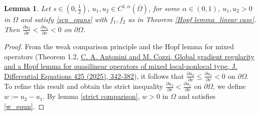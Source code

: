 \documentclass[10pt,a4paper]{amsart}
\newtheorem{lemma}[theorem]{Lemma}
\newcommand{\Om}{\Omega}
\newcommand{\pa}{\partial}
\begin{document}
\begin{lemma}\label{hopf_first}
    Let $s \in \left(0, \frac{1}{2}\right)$, $u_1, u_2 \in C^{1,\alpha}(\overline{\Om})$, for some $\alpha\in(0,1)$, $u_1, u_2 > 0$ in $\Om$ and satisfy \eqref{scp_equns} with $f_1, f_2$ as in Theorem \ref{Hopf lemma_linear case}. Then $\frac{\pa u_2}{\pa\nu} < \frac{\pa u_1}{\pa\nu} < 0$ on $\pa\Om$.
\end{lemma}

\begin{proof}
    From the weak comparison principle and the Hopf lemma for mixed operators (Theorem 1.2, \href{https://doi.org/10.1016/j.jde.2025.01.030}{C. A. Antonini and M. Cozzi, Global gradient regularity and a Hopf lemma for quasilinear operators of mixed local-nonlocal type, J. Differential Equations 425 (2025), 342-382}), it follows that $\frac{\pa u_2}{\pa\nu} \leq \frac{\pa u_1}{\pa\nu} < 0$ on $\pa\Om$. To refine this result and obtain the strict inequality $\frac{\pa u_2}{\pa\nu} < \frac{\pa u_1}{\pa\nu}$ on $\pa\Om$, we define $w:= u_2 - u_1$. By lemma \ref{strict comparison}, $w > 0$ in $\Om$ and satisfies \eqref{w_equn}.


\end{proof}
\end{document}
